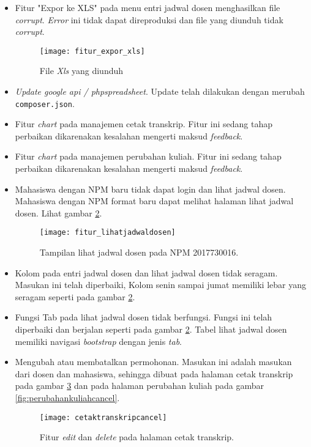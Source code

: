 \documentclass[a4paper,twoside]{article}
\begin{document}
\begin{enumerate}
	\begin{itemize}
		\item Fitur "Expor ke XLS" pada menu  entri jadwal dosen  menghasilkan file \textit{corrupt}. \textit{Error} ini tidak dapat direproduksi dan file yang diunduh tidak \textit{corrupt}.		
		\begin{figure}[H]
			\centering
			\texttt{[image: fitur\_expor\_xls]} 
			\caption{File \textit{Xls} yang diunduh}
			\label{fig:expor_ke_xls} 
		\end{figure}
		
		\item \textit{Update google api / phpspreadsheet}. Update telah dilakukan dengan merubah \texttt{composer.json}.
				
		\item  Fitur \textit{chart} pada manajemen cetak transkrip. Fitur ini sedang tahap perbaikan dikarenakan kesalahan mengerti maksud \textit{feedback}.		
		
		\item Fitur \textit{chart} pada manajemen perubahan kuliah. Fitur ini sedang tahap perbaikan dikarenakan kesalahan mengerti maksud \textit{feedback}.	
		
		\item Mahasiswa dengan NPM baru tidak dapat login dan lihat jadwal dosen. Mahasiswa dengan NPM format baru dapat melihat halaman lihat jadwal dosen. Lihat gambar \ref{fig:lihatjadwaldosen}.		
		\begin{figure}[H]
			\centering
			\texttt{[image: fitur\_lihatjadwaldosen]} 
			\caption{Tampilan lihat jadwal dosen pada NPM 2017730016.}
			\label{fig:lihatjadwaldosen} 
		\end{figure}
				
		\item Kolom pada entri jadwal dosen dan lihat jadwal dosen tidak seragam. Masukan ini telah diperbaiki, Kolom senin sampai jumat memiliki lebar yang seragam seperti pada gambar \ref{fig:lihatjadwaldosen}.
		
		\item Fungsi Tab pada lihat jadwal dosen tidak berfungsi. Fungsi ini telah diperbaiki dan berjalan seperti pada gambar \ref{fig:lihatjadwaldosen}. Tabel lihat jadwal dosen memiliki navigasi \textit{bootstrap} dengan jenis \textit{tab}.
	
		\item Mengubah atau membatalkan permohonan. Masukan ini adalah masukan dari dosen dan mahasiswa, sehingga dibuat pada halaman cetak transkrip pada gambar \ref{fig:cetaktranskripcancel} dan pada halaman perubahan kuliah pada gambar \ref{fig:perubahankuliahcancel}.
		\begin{figure}[H]
			\centering
			\texttt{[image: cetaktranskripcancel]} 
			\caption{Fitur \textit{edit} dan \textit{delete} pada halaman cetak transkrip.}
			\label{fig:cetaktranskripcancel} 
		\end{figure}
	

\end{itemize}
\end{enumerate}
\end{document}
